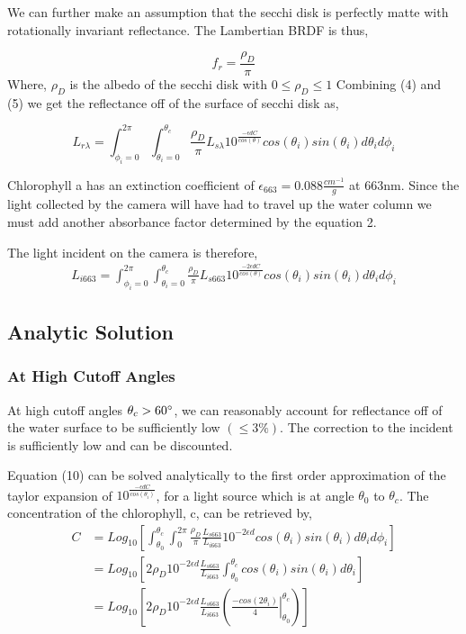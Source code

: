 \documentclass{article}
\begin{document}
We can further make an assumption that the secchi disk is perfectly matte with rotationally
invariant reflectance. The Lambertian BRDF is thus,

\begin{equation}
  f_r = \frac{\rho_D}{\pi}
\end{equation}
Where, $ \rho_D$ is the albedo of the secchi disk with $ 0 \leq \rho_D \leq 1$
Combining (4) and (5) we get the reflectance off of the surface of secchi disk as,

\begin{equation}
  L_{r \lambda} = \int^{2\pi}_{\phi_i = 0}\int^{\theta_c}_{\theta_i = 0}
  \frac{\rho_D}{\pi} L_{s\lambda} 10^\frac{-\epsilon d C}{cos(\theta)}cos(\theta_i)sin(\theta_i)d\theta_i d\phi_i
\end{equation}

Chlorophyll a has an extinction coefficient of $ \epsilon_{663} = 0.088 \frac{cm^{-1}}{g}$ at 663nm.
Since the light collected by the camera will have had to travel up the water column we must add
another absorbance factor determined by the equation 2.

The light incident on the camera is therefore,
\begin{align}
  L_{i 663} = \int^{2\pi}_{\phi_i = 0}\int^{\theta_c}_{\theta_i = 0}
  \frac{\rho_D}{\pi}  L_{s 663} 10^\frac{-2\epsilon d C}{cos(\theta)}cos(\theta_i)sin(\theta_i)d\theta_i d\phi_i
\end{align}
\subsection{Analytic Solution}
\subsubsection{At High Cutoff Angles}
At high cutoff angles $ \theta_c > 60 \degree$, we can reasonably account for reflectance off
of the water surface to be sufficiently low $ (\leq 3\%)$. The correction to the incident is
sufficiently low and can be discounted.

Equation (10) can be solved analytically to the first order approximation of the taylor expansion of
$10^{\frac{-\epsilon dC}{cos(\theta_i)}}$, for a light source which is at angle $\theta_0$ to $ \theta_{c}$.
The concentration of the chlorophyll, c, can be retrieved by,
\begin{align}
  C &= Log_{10}\left [ \int_{\theta_0}^{\theta_c} \int_{0}^{2\pi}
        \frac{\rho_D}{\pi} \frac{L_{s 663}} {L_{i 663}} 10^{-2\epsilon d}cos(\theta_i)sin(\theta_i)d\theta_i d\phi_i\right]
    \\ &= Log_{10}\left[2 \rho_D  10^{-2\epsilon d}\frac{L_{s 663}} {L_{i 663}}\int_{\theta_0}^{\theta_c}cos(\theta_i)sin(\theta_i)d\theta_i\right]
    \\ &= Log_{10}\left[2 \rho_D  10^{-2\epsilon d}\frac{L_{s 663}} {L_{i 663}} \left( \left. \frac{-cos(2\theta_i)}{4} \right\rvert^{\theta_c}_{\theta_0}\right)\right]
\end{align}
\end{document}
